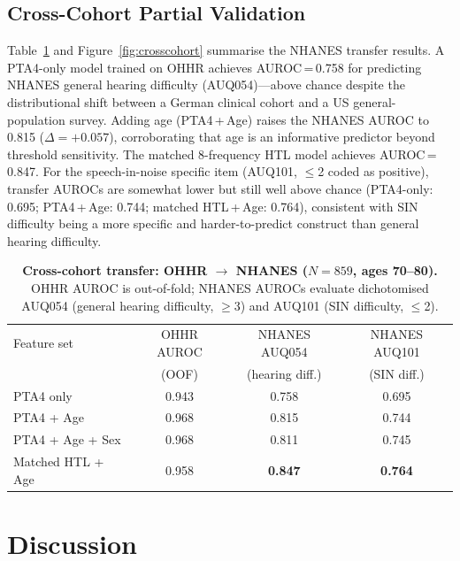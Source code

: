 \documentclass[12pt,a4paper]{article}
\begin{document}
\subsection{Cross-Cohort Partial Validation}

Table~\ref{tab:crosscohort} and Figure~\ref{fig:crosscohort} summarise the
NHANES transfer results.  A PTA4-only model trained on OHHR achieves
AUROC\,=\,0.758 for predicting NHANES general hearing difficulty (AUQ054)---above
chance despite the distributional shift between a German clinical cohort and a
US general-population survey.  Adding age (PTA4\,+\,Age) raises the NHANES
AUROC to 0.815 ($\Delta{=}+0.057$), corroborating that age is an informative
predictor beyond threshold sensitivity.  The matched 8-frequency HTL model
achieves AUROC\,=\,0.847.  For the speech-in-noise specific item (AUQ101,
$\leq$2 coded as positive), transfer AUROCs are somewhat lower but still
well above chance (PTA4-only: 0.695; PTA4\,+\,Age: 0.744; matched HTL\,+\,Age:
0.764), consistent with SIN difficulty being a more specific and
harder-to-predict construct than general hearing difficulty.

\begin{table}[htbp]
\caption{\textbf{Cross-cohort transfer: OHHR $\to$ NHANES ($N{=}859$, ages
70--80).}  OHHR AUROC is out-of-fold; NHANES AUROCs evaluate dichotomised
AUQ054 (general hearing difficulty, $\geq$3) and AUQ101 (SIN difficulty,
$\leq$2).}
\label{tab:crosscohort}
\centering\small
\begin{tabular}{lccc}
\toprule
Feature set & OHHR AUROC & NHANES AUQ054 & NHANES AUQ101 \\
            & (OOF)      & (hearing diff.) & (SIN diff.) \\
\midrule
PTA4 only         & 0.943 & 0.758 & 0.695 \\
PTA4 + Age        & 0.968 & 0.815 & 0.744 \\
PTA4 + Age + Sex  & 0.968 & 0.811 & 0.745 \\
Matched HTL + Age & 0.958 & \textbf{0.847} & \textbf{0.764} \\
\bottomrule
\end{tabular}
\end{table}

\section{Discussion}
\end{document}
